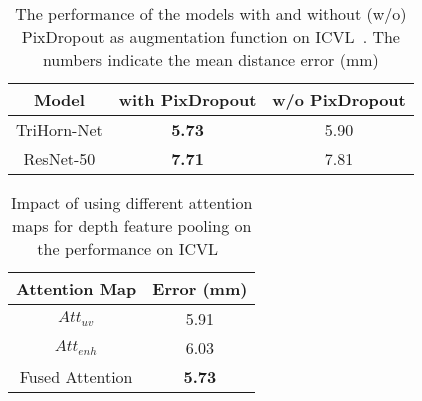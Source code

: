 \documentclass{article}
\begin{document}
\begin{table}
\caption{The performance of the models with and without (w/o) PixDropout as augmentation function on ICVL~\cite{tang2014latent}. The numbers indicate the mean distance error (mm)}
\centering
\setlength{\tabcolsep}{10pt}
\renewcommand{\arraystretch}{1.05}
\begin{tabular}{ccc}
            \hline
            Model & with PixDropout    &   w/o PixDropout       \\
            \hline
                TriHorn-Net          &         \textbf{5.73}     &  5.90    \\
                ResNet-50            &         \textbf{7.71}     &  7.81     \\

            \hline
        \end{tabular}
\label{tab:PixDropout}
\end{table}
\begin{table}[t]
\caption{Impact of using different attention maps for depth feature pooling on the performance on ICVL~\cite{tang2014latent}}
\centering
\setlength{\tabcolsep}{10pt}
\renewcommand{\arraystretch}{1.05}
\begin{tabular}{cc}
            \hline
            Attention Map    &   Error (mm)       \\
            \hline
                $Att_{uv}$           &         5.91   \\
                $Att_{enh}$            &         6.03  \\
                Fused Attention            &        \textbf{5.73}  \\


            \hline
        \end{tabular}
\label{tab:attention}
\end{table}
  
\end{document}
